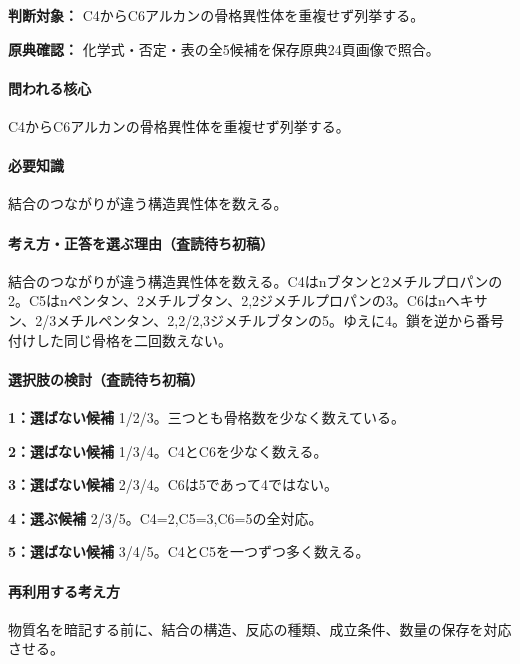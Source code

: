 \noindent\textbf{判断対象：} C4からC6アルカンの骨格異性体を重複せず列挙する。\par

\noindent\textbf{原典確認：} 化学式・否定・表の全5候補を保存原典24頁画像で照合。\par

\paragraph{問われる核心} C4からC6アルカンの骨格異性体を重複せず列挙する。

\paragraph{必要知識} 結合のつながりが違う構造異性体を数える。

\paragraph{考え方・正答を選ぶ理由（査読待ち初稿）} 結合のつながりが違う構造異性体を数える。C4はnブタンと2メチルプロパンの2。C5はnペンタン、2メチルブタン、2,2ジメチルプロパンの3。C6はnヘキサン、2/3メチルペンタン、2,2/2,3ジメチルブタンの5。ゆえに4。鎖を逆から番号付けした同じ骨格を二回数えない。

\paragraph{選択肢の検討（査読待ち初稿）}\mbox{}\par

\noindent\textbf{1：選ばない候補} 1/2/3。三つとも骨格数を少なく数えている。\par

\noindent\textbf{2：選ばない候補} 1/3/4。C4とC6を少なく数える。\par

\noindent\textbf{3：選ばない候補} 2/3/4。C6は5であって4ではない。\par

\noindent\textbf{4：選ぶ候補} 2/3/5。C4=\allowbreak{}2,C5=\allowbreak{}3,C6=\allowbreak{}5の全対応。\par

\noindent\textbf{5：選ばない候補} 3/4/5。C4とC5を一つずつ多く数える。\par

\paragraph{再利用する考え方} 物質名を暗記する前に、結合の構造、反応の種類、成立条件、数量の保存を対応させる。

